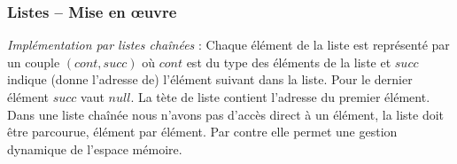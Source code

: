 \begin{frame} \frametitle{Listes -- Mise en {\oe}uvre}

\emph{Implémentation par listes chaînées} :
Chaque élément de la liste est représenté par un couple $(cont,succ)$ où $cont$ est du type des éléments de la liste et $succ$ indique (donne l'adresse de) l'élément suivant dans la liste. Pour le dernier élément $succ$ vaut $null$. 
La  tète  de  liste  contient  l'adresse  du  premier  élément. \\

Dans une liste chaînée nous n'avons pas d'accès direct à un élément, la liste doit être parcourue, élément par élément. Par contre elle permet une gestion dynamique de l'espace mémoire.

\end{frame}

